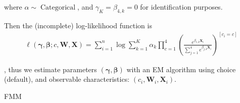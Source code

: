 where $\alpha\sim \operatorname{Categorical}$, and $\gamma_{K} = \beta_{4,k}=0$ for identification purposes. 

Then the (incomplete) log-likelihood function is
\begin{align*}
    \ell(\bm{\gamma}, \bm{\beta}; c, \mathbf{W},  \mathbf{X}) = \sum_{i=1}^n \log\sum_{k=1}^K \alpha_k \prod_{c=1}^4\left(\frac{e^{\beta_{c,k} \mathbf{X}_i}}{\sum_{j=1}^{4} e^{\beta_{j,k}  \mathbf{X}_i}}\right)^{[c_i=c]} 
\end{align*}

, thus we estimate parameters $(\bm{\gamma}, \bm{\beta})$ with an EM algorithm using choice (default), and observable characteristics: $(c_i,\mathbf{W}_i,\mathbf{X}_i)$.


\begin{table}[H]
\caption{FMM}
\label{fmm_table}
\begin{center}
\scriptsize{}
\end{center}
 \scriptsize

\end{table}


